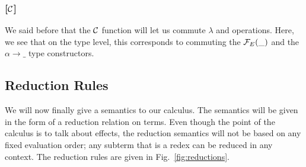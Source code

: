 \documentclass{llncs}
\begin{document}
\subsubsection*{[$\mathcal{C}$]}

We said before that the $\mathcal{C}$ function will let us commute $\lambda$ and
operations. Here, we see that on the type level, this corresponds to
commuting the $\mathcal{F}_E(\_)$ and the $\alpha \to \_$ type constructors.

\subsection{Reduction Rules}
\label{ssec:reductions}

We will now finally give a semantics to our calculus. The semantics will be
given in the form of a reduction relation on terms. Even though the point
of the calculus is to talk about effects, the reduction semantics will not
be based on any fixed evaluation order; any subterm that is a redex can be
reduced in any context. The reduction rules are given in
Fig.~\ref{fig:reductions}.
\end{document}

